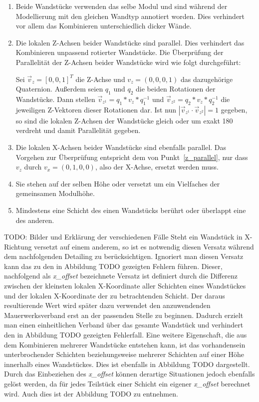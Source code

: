 \begin{enumerate}
    \item Beide Wandstücke verwenden das selbe Modul und sind während der Modellierung mit den gleichen Wandtyp annotiert worden. 
    Dies verhindert vor allem das Kombinieren unterschiedlich dicker Wände.
    \item\label{z_parallel} Die lokalen Z-Achsen beider Wandstücke sind parallel. 
    Dies verhindert das Kombinieren unpassend rotierter Wandstücke.
    Die Überprüfung der Parallelität der Z-Achsen beider Wandstücke wird wie folgt durchgeführt:

    Sei
    \(\vec{v}_z = {[0, 0, 1]}^T\)
    die Z-Achse und \(v_z = (0, 0, 0, 1)\) das dazugehörige Quaternion. 
    Außerdem seien \(q_1\) und \(q_2\) die beiden Rotationen der Wandstücke. Dann stellen 
    \(\vec{v}_{z^1} = q_1 * v_z * q_1^{-1}\) und 
    \(\vec{v}_{z^2} = q_2 * v_z * q_2^{-1}\) die jeweiligen \glqq{}Z-Vektoren\grqq{} dieser Rotationen dar.
    Ist nun \(|\vec{v}_{z^1} \cdot \vec{v}_{z^2}| = 1\) gegeben, so sind die lokalen Z-Achsen der Wandstücke gleich oder um exakt 180\degree{} verdreht und damit Parallelität gegeben.
    \item Die lokalen X-Achsen beider Wandstücke sind ebenfalls parallel. Das Vorgehen zur Überprüfung entspricht dem von Punkt~\ref{z_parallel}, nur dass \(v_z\) durch \(v_x = (0, 1, 0, 0)\), also der X-Achse, ersetzt werden muss.
    \item Sie stehen auf der selben Höhe oder versetzt um ein Vielfaches der gemeinsamen Modulhöhe.
    \item Mindestens eine Schicht des einen Wandstücks berührt oder überlappt eine des anderen.
\end{enumerate}

TODO: Bilder und Erklärung der verschiedenen Fälle
Steht ein Wandstück in X-Richtung versetzt auf einem anderem, so ist es notwendig diesen Versatz während dem nachfolgenden Detailing zu berücksichtigen.
Ignoriert man diesen Versatz kann das zu den in Abbildung TODO gezeigten Fehlern führen.
Dieser, nachfolgend als \textit{x\_offset} bezeichnete Versatz ist definiert durch die Differenz zwischen der kleinsten lokalen X-Koordinate aller Schichten eines Wandstückes und der lokalen X-Koordinate der zu betrachtenden Schicht.
Der daraus resultierende Wert wird später dazu verwendet den anzuwendenden Mauerwerksverband erst an der passenden Stelle zu beginnen.
Dadurch erzielt man einen einheitlichen Verband über das gesamte Wandstück und verhindert den in Abbildung TODO gezeigten Fehlerfall.
Eine weitere Eigenschaft, die aus dem Kombinieren mehrerer Wandstücke entstehen kann, ist das vorhandensein unterbrochender Schichten beziehungsweise mehrerer Schichten auf einer Höhe innerhalb eines Wandstückes.
Dies ist ebenfalls in Abbildung TODO dargestellt.
Durch das Einbeziehen des \textit{x\_offset} können derartige Situationen jedoch ebenfalls gelöst werden, da für jedes Teilstück einer Schicht ein eigener \textit{x\_offset} berechnet wird.
Auch dies ist der Abbildung TODO zu entnehmen.

